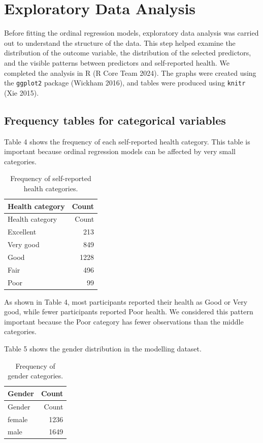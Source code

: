 \documentclass{article}
\begin{document}
\section{Exploratory Data Analysis}\label{exploratory-data-analysis}

Before fitting the ordinal regression models, exploratory data analysis
was carried out to understand the structure of the data. This step
helped examine the distribution of the outcome variable, the
distribution of the selected predictors, and the visible patterns
between predictors and self-reported health. We completed the analysis
in R (R Core Team 2024). The graphs were created using the
\texttt{ggplot2} package (Wickham 2016), and tables were produced using
\texttt{knitr} (Xie 2015).

\subsection{Frequency tables for categorical
variables}\label{frequency-tables-for-categorical-variables}

Table 4 shows the frequency of each self-reported health category. This
table is important because ordinal regression models can be affected by
very small categories.

\begin{longtable}[]{@{}lr@{}}
\caption{Frequency of self-reported health categories.}\tabularnewline
\toprule\noalign{}
Health category & Count \\
\midrule\noalign{}
\endfirsthead
\toprule\noalign{}
Health category & Count \\
\midrule\noalign{}
\endhead
\bottomrule\noalign{}
\endlastfoot
Excellent & 213 \\
Very good & 849 \\
Good & 1228 \\
Fair & 496 \\
Poor & 99 \\
\end{longtable}

As shown in Table 4, most participants reported their health as Good or
Very good, while fewer participants reported Poor health. We considered
this pattern important because the Poor category has fewer observations
than the middle categories.

Table 5 shows the gender distribution in the modelling dataset.

\begin{longtable}[]{@{}lr@{}}
\caption{Frequency of gender categories.}\tabularnewline
\toprule\noalign{}
Gender & Count \\
\midrule\noalign{}
\endfirsthead
\toprule\noalign{}
Gender & Count \\
\midrule\noalign{}
\endhead
\bottomrule\noalign{}
\endlastfoot
female & 1236 \\
male & 1649 \\
\end{longtable}
\end{document}
